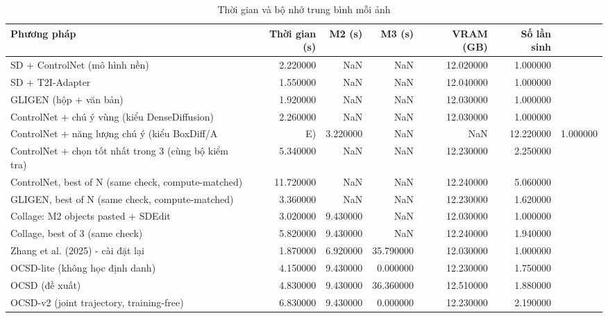 \begin{table}
\caption{Thời gian và bộ nhớ trung bình mỗi ảnh}
\begin{tabular}{lrrrrr}
\toprule
Phương pháp & Thời gian (s) & M2 (s) & M3 (s) & VRAM (GB) & Số lần sinh \\
\midrule
SD + ControlNet (mô hình nền) & 2.220000 & NaN & NaN & 12.020000 & 1.000000 \\
SD + T2I-Adapter & 1.550000 & NaN & NaN & 12.040000 & 1.000000 \\
GLIGEN (hộp + văn bản) & 1.920000 & NaN & NaN & 12.030000 & 1.000000 \\
ControlNet + chú ý vùng (kiểu DenseDiffusion) & 2.260000 & NaN & NaN & 12.030000 & 1.000000 \\
ControlNet + năng lượng chú ý (kiểu BoxDiff/A&E) & 3.220000 & NaN & NaN & 12.220000 & 1.000000 \\
ControlNet + chọn tốt nhất trong 3 (cùng bộ kiểm tra) & 5.340000 & NaN & NaN & 12.230000 & 2.250000 \\
ControlNet, best of N (same check, compute-matched) & 11.720000 & NaN & NaN & 12.240000 & 5.060000 \\
GLIGEN, best of N (same check, compute-matched) & 3.360000 & NaN & NaN & 12.230000 & 1.620000 \\
Collage: M2 objects pasted + SDEdit & 3.020000 & 9.430000 & NaN & 12.030000 & 1.000000 \\
Collage, best of 3 (same check) & 5.820000 & 9.430000 & NaN & 12.240000 & 1.940000 \\
Zhang et al. (2025) - cài đặt lại & 1.870000 & 6.920000 & 35.790000 & 12.030000 & 1.000000 \\
OCSD-lite (không học định danh) & 4.150000 & 9.430000 & 0.000000 & 12.230000 & 1.750000 \\
OCSD (đề xuất) & 4.830000 & 9.430000 & 36.360000 & 12.510000 & 1.880000 \\
OCSD-v2 (joint trajectory, training-free) & 6.830000 & 9.430000 & 0.000000 & 12.230000 & 2.190000 \\
\bottomrule
\end{tabular}
\end{table}
